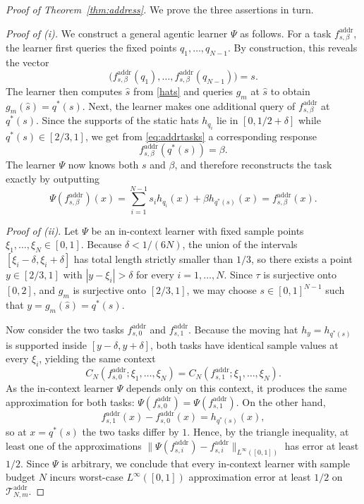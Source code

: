 \documentclass[10pt,a4paper]{amsart}
\begin{document}
\begin{proof}[Proof of Theorem~\ref{thm:address}]
We prove the three assertions in turn.

\medskip
\noindent
\emph{Proof of (i).}
We construct a general agentic learner $\Psi$ as follows.
For a task $f^{\mathrm{addr}}_{s,\beta}$, the %
learner first queries the fixed points $q_1,\dots,q_{N-1}$. By construction,
this reveals the vector
\[
\bigl(f^{\mathrm{addr}}_{s,\beta}(q_1),\dots,f^{\mathrm{addr}}_{s,\beta}(q_{N-1})\bigr)=s.
\]
The learner then computes $\widehat s$ from \eqref{hats} and queries $g_m$ at $\widehat s$ to obtain
$
    g_m(\widehat s)=q^\ast(s)
$.
Next, the learner makes one additional query of $f^{\mathrm{addr}}_{s,\beta}$ at $q^\ast(s)$. 
Since the supports of the static hats $h_{q_i}$ lie in $[0,1/2+\delta]$
while $q^\ast(s)\in[2/3,1]$, we get from \eqref{eq:addrtasks} a corresponding response
\[
    f^{\mathrm{addr}}_{s,\beta}(q^\ast(s))=\beta.
\]
The learner $\Psi$ now knows both $s$ and $\beta$, and therefore reconstructs the task exactly by
outputting
\[
\Psi(f^{\mathrm{addr}}_{s,\beta})(x)
=\sum_{i=1}^{N-1} s_i h_{q_i}(x)+\beta h_{q^\ast(s)}(x) = f^{\mathrm{addr}}_{s,\beta}(x).
\]

\medskip
\noindent
\emph{Proof of (ii).}
Let $\Psi$ be an in-context learner with fixed sample points $\xi_1,\dots,\xi_N\in[0,1]$.
Because $\delta<1/(6N)$, the union of the intervals $[\xi_i-\delta,\xi_i+\delta]$ has total length
strictly smaller than $1/3$, so there exists a point $y\in[2/3,1]$ with
$|y-\xi_i|>\delta$ for every $i=1,\dots,N$.
Since $\tau$ is surjective onto $[0,2]$, and $g_m$ is surjective onto $[2/3,1]$, we may choose $s\in[0,1]^{N-1}$ such that $y=g_m(\widehat s)=q^\ast(s)$.

Now consider the two tasks $f^{\mathrm{addr}}_{s,0}$ and $f^{\mathrm{addr}}_{s,1}$. Because the moving hat $h_y=h_{q^\ast(s)}$
is supported inside $[y-\delta,y+\delta]$,
both tasks have identical sample values at every
$\xi_i$, yielding the same context 
\begin{equation*}
    C_N(f^{\mathrm{addr}}_{s,0};\xi_1,\dots,\xi_N)
    = C_N(f^{\mathrm{addr}}_{s,1};\xi_1,\dots,\xi_N).
\end{equation*}
As the in-context learner $\Psi$ depends only on this context, it produces the same approximation for both tasks: $\Psi(f^{\mathrm{addr}}_{s,0})=\Psi(f^{\mathrm{addr}}_{s,1})$. 
On the other hand,
\[
f^{\mathrm{addr}}_{s,1}(x)-f^{\mathrm{addr}}_{s,0}(x)=h_{q^\ast(s)}(x),
\]
so at $x=q^\ast(s)$ the two tasks differ by $1$. 
Hence, by the triangle inequality, at least one of the approximations $\|\Psi(f^{\mathrm{addr}}_{s,i})-f^{\mathrm{addr}}_{s,i}\|_{L^{\infty}([0,1])}$ has error
at least $1/2$.
Since $\Psi$ is arbitrary, we conclude that every in-context learner with sample budget $N$ incurs worst-case $L^{\infty}([0,1])$ approximation error at least $1/2$ on $\mathcal T_{N,m}^{\mathrm{addr}}$.


\end{proof}
\end{document}
